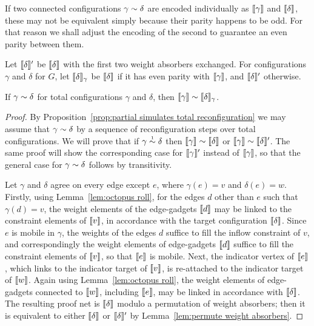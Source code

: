 \documentclass{sigplanconf-modified}
\begin{document}
If two connected configurations $\gamma\perm\delta$ are encoded individually as $\llbracket\gamma\rrbracket$ and $\llbracket\delta\rrbracket$, these may not be equivalent simply because their parity happens to be odd.
%
For that reason we shall adjust the encoding of the second to guarantee an even parity between them.

\begin{definition}
%
Let $\llbracket\delta\rrbracket'$ be $\llbracket\delta\rrbracket$ with the first two weight absorbers exchanged.
%
For configurations $\gamma$ and $\delta$ for $G$, let $\llbracket\delta\rrbracket_\gamma$ be $\llbracket\delta\rrbracket$ if it has even parity with $\llbracket\gamma\rrbracket$, and $\llbracket\delta\rrbracket'$ otherwise.
%
\end{definition}



\begin{lemma}
\label{lem:completeness}
If $\gamma\perm\delta$ for total configurations $\gamma$ and $\delta$, then $\itn\gamma\perm\itn\delta_\gamma$.
\end{lemma}

\begin{proof}
By Proposition~\ref{prop:partial simulates total reconfiguration} we may assume that $\gamma\perm\delta$ by a sequence of reconfiguration steps over total configurations.
%
We will prove that if $\gamma\perm*\delta$ then $\itn\gamma\perm\itn\delta$ or $\itn\gamma\perm\itn\delta'$.
%
The same proof will show the corresponding case for $\llbracket\gamma\rrbracket'$ instead of $\llbracket\gamma\rrbracket$, so that the general case for $\gamma\perm\delta$ follows by transitivity.



Let $\gamma$ and $\delta$ agree on every edge except $e$, where $\gamma(e)=v$ and $\delta(e)=w$.
%
Firstly, using Lemma~\ref{lem:octopus roll}, for the edges $d$ other than $e$ such that $\gamma(d)=v$, the weight elements of the edge-gadgets $\llbracket d\rrbracket$ may be linked to the constraint elements of $\llbracket v\rrbracket$, in accordance with the target configuration $\llbracket\delta\rrbracket$.
%
Since $e$ is mobile in $\gamma$, the weights of the edges $d$ suffice to fill the inflow constraint of $v$, and correspondingly the weight elements of edge-gadgets $\llbracket d\rrbracket$ suffice to fill the constraint elements of $\llbracket v\rrbracket$, so that $\llbracket e\rrbracket$ is mobile.
%
Next, the indicator vertex of $\llbracket e\rrbracket$, which links to the indicator target of $\llbracket v\rrbracket$, is re-attached to the indicator target of $\llbracket w\rrbracket$.
%
Again using Lemma~\ref{lem:octopus roll}, the weight elements of edge-gadgets connected to $\llbracket w\rrbracket$, including $\llbracket e\rrbracket$, may be linked in accordance with $\llbracket\delta\rrbracket$.
%
The resulting proof net is $\llbracket\delta\rrbracket$ modulo a permutation of weight absorbers; then it is equivalent to either $\llbracket\delta\rrbracket$ or $\llbracket\delta\rrbracket'$ by Lemma~\ref{lem:permute weight absorbers}.
\end{proof}
\end{document}

